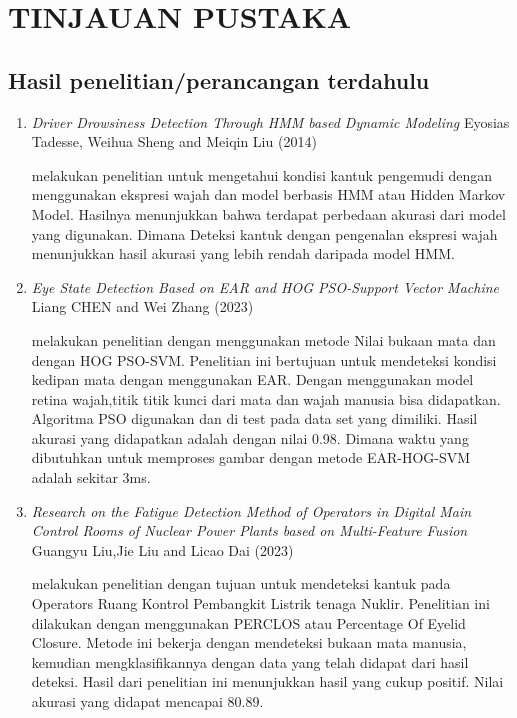\chapter{TINJAUAN PUSTAKA}
\label{chap:tinjauanpustaka}

\section{Hasil penelitian/perancangan terdahulu}
\label{sec:HasilTerdahulu}
\begin{enumerate}
  \item \emph{Driver Drowsiness Detection Through HMM based Dynamic Modeling} Eyosias Tadesse, Weihua Sheng and Meiqin Liu (2014)
  
  \parencite{6907440} melakukan penelitian untuk mengetahui kondisi kantuk
  pengemudi dengan menggunakan ekspresi wajah dan model berbasis HMM atau Hidden Markov Model.
  Hasilnya menunjukkan bahwa terdapat perbedaan akurasi dari model yang digunakan. Dimana Deteksi kantuk
  dengan pengenalan ekspresi wajah menunjukkan hasil akurasi yang lebih rendah daripada model HMM.

  \item \emph{Eye State Detection Based on EAR and HOG PSO-Support Vector Machine} Liang CHEN and Wei Zhang (2023)

  \parencite{10270738} melakukan penelitian dengan menggunakan metode Nilai bukaan mata dan 
  dengan HOG PSO-SVM. Penelitian ini bertujuan untuk mendeteksi kondisi kedipan mata dengan 
  menggunakan EAR. Dengan menggunakan model retina wajah,titik titik kunci dari mata dan wajah 
  manusia bisa didapatkan. Algoritma PSO digunakan dan di test pada data set yang dimiliki. Hasil akurasi yang 
  didapatkan adalah dengan nilai 0.98. Dimana waktu yang dibutuhkan untuk memproses gambar dengan 
  metode EAR-HOG-SVM adalah sekitar 3ms.
  
  \item \emph{Research on the Fatigue Detection Method of Operators in Digital Main Control Rooms of Nuclear Power Plants based on Multi-Feature Fusion}
  Guangyu Liu,Jie Liu and Licao Dai (2023)

  \parencite{tan2018research}melakukan penelitian dengan tujuan untuk mendeteksi kantuk pada Operators Ruang Kontrol Pembangkit Listrik 
  tenaga Nuklir. Penelitian ini dilakukan dengan menggunakan PERCLOS atau Percentage Of Eyelid Closure. 
  Metode ini bekerja dengan mendeteksi bukaan mata manusia, kemudian mengklasifikannya dengan data 
  yang telah didapat dari hasil deteksi. Hasil dari penelitian ini menunjukkan hasil yang cukup positif. 
  Nilai akurasi yang didapat mencapai 80.89.
\end{enumerate}

